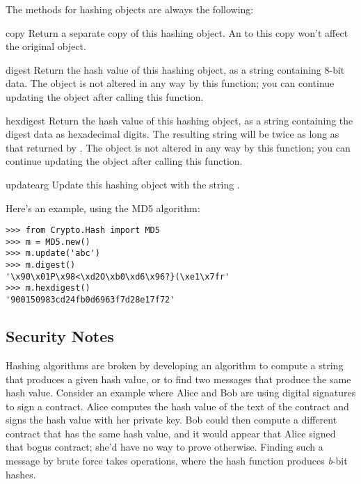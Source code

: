 \documentclass{howto}
\begin{document}
The methods for hashing objects are always the following:

\begin{funcdesc}{copy}{}
Return a separate copy of this hashing object.  An  to this
  copy won't affect the original object.
\end{funcdesc}

\begin{funcdesc}{digest}{}
Return the hash value of this hashing object, as a string containing 8-bit data.  The object is not
altered in any way by this function; you can continue updating the
object after calling this function.
\end{funcdesc}

\begin{funcdesc}{hexdigest}{}
Return the hash value of this hashing object, as a string containing the
digest data as hexadecimal digits.  The resulting string will be twice
as long as that returned by .  The object is not altered
in any way by this function; you can continue updating the object after
calling this function.
\end{funcdesc}

\begin{funcdesc}{update}{arg}
Update this hashing object with the string .
\end{funcdesc}

Here's an example, using the MD5 algorithm:

\begin{verbatim}
>>> from Crypto.Hash import MD5
>>> m = MD5.new()
>>> m.update('abc')
>>> m.digest()
'\x90\x01P\x98<\xd2O\xb0\xd6\x96?}(\xe1\x7fr'
>>> m.hexdigest()
'900150983cd24fb0d6963f7d28e17f72'
\end{verbatim}

\subsection{Security Notes}

Hashing algorithms are broken by developing an algorithm to compute a
string that produces a given hash value, or to find two messages that
produce the same hash value. Consider an example where Alice and Bob
are using digital signatures to sign a contract.  Alice computes the
hash value of the text of the contract and signs the hash value with
her private key.  Bob could then compute a different contract that has
the same hash value, and it would appear that Alice signed that bogus
contract; she'd have no way to prove otherwise.  Finding such a
message by brute force takes  operations, where the
hash function produces \emph{b}-bit hashes.
\end{document}
